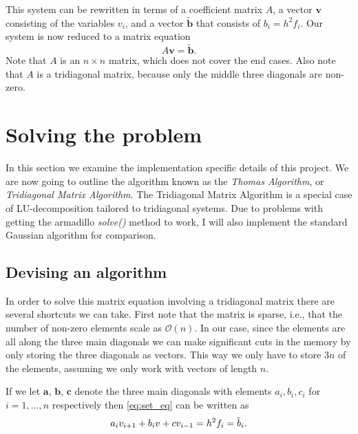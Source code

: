 \documentclass[10pt,a4paper]{amsart}
\begin{document}
  This system can be rewritten in terms of a coefficient matrix $A$, a vector
  $\mathbf v$ consisting of the variables $v_i$, and a vector
  $\mathbf{\tilde{b}}$ that consists of $b_i = h^2f_i$. Our system is now
  reduced to a matrix equation
  \begin{equation}
    \label{eq:matrix}
    A \mathbf v = \mathbf{\tilde b}.
  \end{equation}
  Note that $A$ is an $n\times n$ matrix, which does not cover the end cases.
  Also note that $A$ is a tridiagonal matrix, because only the middle three
  diagonals are non-zero.
  
  \section{Solving the problem}
  \label{sec:solving_the_problem}
    
  In this section we examine the implementation specific details of this
  project.  We are now going to outline the algorithm known as the
  \textit{Thomas Algorithm}, or \textit{Tridiagonal Matrix
  Algorithm}.\cite{thomasalgo} The Tridiagonal Matrix Algorithm is a special case of LU-decomposition tailored to tridiagonal systems. Due to problems with getting the armadillo \textit{solve()} method to work, I will also implement the standard Gaussian algorithm for comparison.

  \subsection{Devising an algorithm}
  \label{sub:devising_an_algorithm}
  
  In order to solve this matrix equation involving a tridiagonal matrix there
  are several shortcuts we can take. First note that the matrix is sparse,
  i.e., that the number of non-zero elements scale as $\mathcal{O}(n)$. In our
  case, since the elements are all along the three main diagonals we can make
  significant cuts in the memory by only storing the three diagonals as
  vectors. This way we only have to store $3n$ of the elements, assuming we
  only work with vectors of length $n$.
  
  If we let $\mathbf a$, $\mathbf b$, $\mathbf c$ denote the three main
  diagonals with elements $a_i, b_i, c_i$ for $i = 1, \ldots, n$ respectively
  then \cref{eq:set_eq} can be written as
  \begin{equation}
    \notag
    a_iv_{i+1} + b_iv + cv_{i-1} = h^2 f_i = \tilde b_i.
  \end{equation}
  
\end{document}
